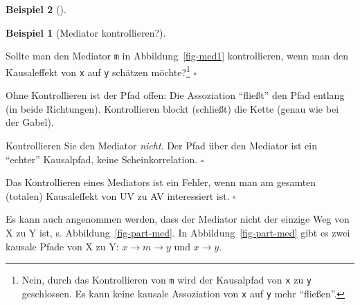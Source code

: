 \documentclass[
  ngerman,
  letterpaper,
  twoside,
  open=any]{scrbook}
\theoremstyle{definition}
\newtheorem{example}{Beispiel}[chapter]
\theoremstyle{plain}
\theoremstyle{definition}
\theoremstyle{definition}
\theoremstyle{remark}
\begin{document}
\begin{example}[]
\begin{example}[Mediator
kontrollieren?]\protect\hypertarget{exm-mediator}{}\label{exm-mediator}

Sollte man den Mediator \texttt{m} in Abbildung~\ref{fig-med1}
kontrollieren, wenn man den Kausaleffekt von \texttt{x} auf \texttt{y}
schätzen möchte?\footnote{Nein, durch das Kontrollieren von \texttt{m}
  wird der Kausalpfad von \texttt{x} zu \texttt{y} geschlossen. Es kann
  keine kausale Assoziation von \texttt{x} auf \texttt{y} mehr
  \enquote{fließen}.} \(\square\)

\end{example}

Ohne Kontrollieren ist der Pfad offen: Die Assoziation \enquote{fließt}
den Pfad entlang (in beide Richtungen). Kontrollieren blockt (schließt)
die Kette (genau wie bei der Gabel).

\begin{tcolorbox}[enhanced jigsaw, arc=.35mm, bottomrule=.15mm, bottomtitle=1mm, breakable, colback=white, colbacktitle=quarto-callout-tip-color!10!white, colframe=quarto-callout-tip-color-frame, coltitle=black, left=2mm, leftrule=.75mm, opacityback=0, opacitybacktitle=0.6, rightrule=.15mm, title=\textcolor{quarto-callout-tip-color}{\faLightbulb}\hspace{0.5em}{Tipp}, titlerule=0mm, toprule=.15mm, toptitle=1mm]

Kontrollieren Sie den Mediator \emph{nicht}. Der Pfad über den Mediator
ist ein \enquote{echter} Kausalpfad, keine Scheinkorrelation.
\(\square\)

\end{tcolorbox}

\begin{tcolorbox}[enhanced jigsaw, arc=.35mm, bottomrule=.15mm, bottomtitle=1mm, breakable, colback=white, colbacktitle=quarto-callout-important-color!10!white, colframe=quarto-callout-important-color-frame, coltitle=black, left=2mm, leftrule=.75mm, opacityback=0, opacitybacktitle=0.6, rightrule=.15mm, title=\textcolor{quarto-callout-important-color}{\faExclamation}\hspace{0.5em}{Wichtig}, titlerule=0mm, toprule=.15mm, toptitle=1mm]

Das Kontrollieren eines Mediators ist ein Fehler, wenn man am gesamten
(totalen) Kausaleffekt von UV zu AV interessiert ist. \(\square\)

\end{tcolorbox}

Es kann auch angenommen werden, dass der Mediator nicht der einzige Weg
von X zu Y ist, s. Abbildung~\ref{fig-part-med}. In
Abbildung~\ref{fig-part-med} gibt es zwei kausale Pfade von X zu Y:
\(x\rightarrow m \rightarrow y\) und \(x \rightarrow y\).


\end{example}
\end{document}
